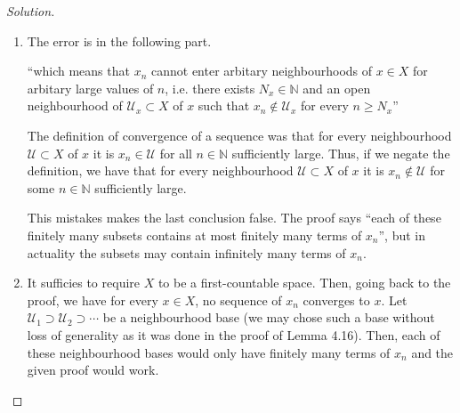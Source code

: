 \documentclass[a4paper]{article}
\theoremstyle{definition}
\begin{document}
\begin{proof}[Solution]
    \begin{enumerate}
        \item The error is in the following part.
    
        ``which means that \(x_n\) {\color{red}cannot enter} arbitary neighbourhoods of \(x \in X\) for arbitary large values of \(n\), i.e. there exists \(N_x \in \mathbb{N}\) and an open neighbourhood of \(\mathcal{U}_x \subset X\) of \(x\) such that \(x_n \not\in \mathcal{U}_x\) {\color{red}for every} \(n \geq N_x\)''
    
        The definition of convergence of a sequence was that for every neighbourhood \(\mathcal{U} \subset X\) of \(x\) it is \(x_n \in \mathcal{U}\) for all \(n \in \mathbb{N}\) sufficiently large. Thus, if we negate the definition, we have that for every neighbourhood \(\mathcal{U} \subset X\) of \(x\) it is \(x_n \not\in \mathcal{U}\) {\color{red}for some} \(n \in \mathbb{N}\) sufficiently large.
    
        This mistakes makes the last conclusion false. The proof says ``each of these finitely many subsets contains at most finitely many terms of \(x_n\)'', but in actuality the subsets may contain infinitely many terms of \(x_n\).
        \item It sufficies to require \(X\) to be a first-countable space. Then, going back to the proof, we have for every \(x \in X\), no sequence of \(x_n\) converges to \(x\). Let \(\mathcal{U}_1 \supset \mathcal{U}_2 \supset \cdots\) be a neighbourhood base (we may chose such a base without loss of generality as it was done in the proof of Lemma 4.16). Then, each of these neighbourhood bases would only have finitely many terms of \(x_n\) and the given proof would work.
    \end{enumerate}
\end{proof}
\end{document}
